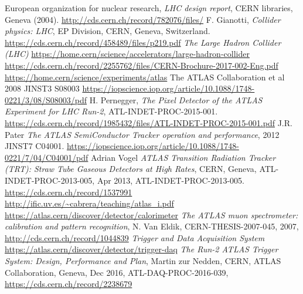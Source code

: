 \documentclass[a4paper, oneside]{book}
\begin{document}
			
	\begin{thebibliography}{17}
			
			
			 European organization for nuclear research, \textit{LHC design report}, CERN libraries, Geneva (2004). \url{http://cds.cern.ch/record/782076/files/}
			 F. Gianotti, \textit{Collider physics: LHC}, EP Division, CERN, Geneva, Switzerland. \url{https://cds.cern.ch/record/458489/files/p219.pdf}
			\textit{The Large Hadron Collider (LHC)}
			\url{https://home.cern/science/accelerators/large-hadron-collider}
			 \url{https://cds.cern.ch/record/2255762/files/CERN-Brochure-2017-002-Eng.pdf}
			 \url{https://home.cern/science/experiments/atlas}
			  The ATLAS Collaboration et al 2008 JINST3 S08003
			\url{https://iopscience.iop.org/article/10.1088/1748-0221/3/08/S08003/pdf}
			 H. Pernegger, \textit{The Pixel Detector of the ATLAS Experiment for LHC Run-2}, ATL-INDET-PROC-2015-001. \url{https://cds.cern.ch/record/1985432/files/ATL-INDET-PROC-2015-001.pdf}
			 J.R. Pater \textit{The ATLAS SemiConductor Tracker operation and performance}, 2012 JINST7 C04001. \url{https://iopscience.iop.org/article/10.1088/1748-0221/7/04/C04001/pdf}
			 Adrian Vogel \textit{ATLAS Transition Radiation Tracker (TRT): Straw Tube Gaseous Detectors at High Rates}, CERN,
			Geneva, ATL-INDET-PROC-2013-005, Apr 2013, ATL-INDET-PROC-2013-005. \url{https://cds.cern.ch/record/1537991}
			\url{http://ific.uv.es/~cabrera/teaching/atlas_i.pdf}\\
			\url{https://atlas.cern/discover/detector/calorimeter}
			\textit{The ATLAS muon spectrometer: calibration and pattern recognition}, N. Van Eldik, CERN-THESIS-2007-045, 2007,
			\url{http://cds.cern.ch/record/1044839}
			\textit{Trigger and Data Acquisition System}
			\url{https://atlas.cern/discover/detector/trigger-daq}	
			\textit{The Run-2 ATLAS Trigger System: Design, Performance and
			Plan}, Martin zur Nedden, CERN, ATLAS Collaboration, Geneva, Dec 2016, ATL-DAQ-PROC-2016-039,
			\url{https://cds.cern.ch/record/2238679}
			

\end{thebibliography}
\end{document}
